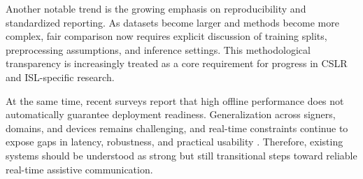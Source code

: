 Another notable trend is the growing emphasis on reproducibility and standardized reporting. As datasets become larger and methods become more complex, fair comparison now requires explicit discussion of training splits, preprocessing assumptions, and inference settings. This methodological transparency is increasingly treated as a core requirement for progress in CSLR and ISL-specific research.

At the same time, recent surveys report that high offline performance does not automatically guarantee deployment readiness. Generalization across signers, domains, and devices remains challenging, and real-time constraints continue to expose gaps in latency, robustness, and practical usability \cite{alqurishi2021deep,alabdullah2024advancements}. Therefore, existing systems should be understood as strong but still transitional steps toward reliable real-time assistive communication.
